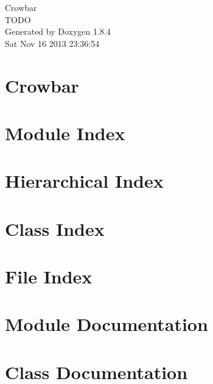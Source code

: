 \documentclass[twoside]{book}
\newcommand{\clearemptydoublepage}{%
  \newpage{\pagestyle{empty}\cleardoublepage}%
}
\begin{document}
\hypersetup{pageanchor=false}
\begin{titlepage}
\vspace*{7cm}
\begin{center}%
{\Large Crowbar \\[1ex]\large T\-O\-D\-O }\\
\vspace*{1cm}
{\large Generated by Doxygen 1.8.4}\\
\vspace*{0.5cm}
{\small Sat Nov 16 2013 23:36:54}\\
\end{center}
\end{titlepage}
\clearemptydoublepage
\tableofcontents
\clearemptydoublepage
{}
\hypersetup{pageanchor=true}

\chapter{Crowbar}
\label{md_README}
\hypertarget{md_README}{}

\chapter{Module Index}

\chapter{Hierarchical Index}

\chapter{Class Index}

\chapter{File Index}

\chapter{Module Documentation}


\chapter{Class Documentation}
























\end{document}
